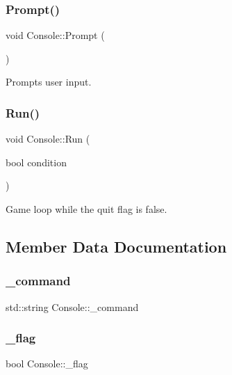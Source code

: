 \subsubsection{\texorpdfstring{Prompt()}{Prompt()}}
{\footnotesize\ttfamily void Console\+::\+Prompt (\begin{DoxyParamCaption}{ }\end{DoxyParamCaption})}



Prompts user input. 

\mbox{\label{class_console_a82b5310199041c8cb8c1a8b56e8f8754}} 
\subsubsection{\texorpdfstring{Run()}{Run()}}
{\footnotesize\ttfamily void Console\+::\+Run (\begin{DoxyParamCaption}\item[{bool}]{condition }\end{DoxyParamCaption})}



Game loop while the quit flag is false. 



\subsection{Member Data Documentation}
\mbox{\label{class_console_aaef25555f0862019ff368aa355432299}} 
\subsubsection{\texorpdfstring{\+\_\+command}{\_command}}
{\footnotesize\ttfamily std\+::string Console\+::\+\_\+command}

\mbox{\label{class_console_afd8769b6be561615f0cd4bd48bbd8278}} 
\subsubsection{\texorpdfstring{\+\_\+flag}{\_flag}}
{\footnotesize\ttfamily bool Console\+::\+\_\+flag}

